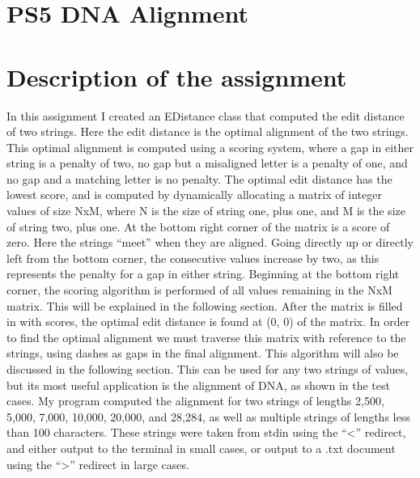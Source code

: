 \documentclass[12pt]{article}
\begin{document}
\section*{PS5 DNA Alignment}
\section[1]{Description of the assignment}
\hfill\begin{minipage}{\dimexpr\textwidth-1cm}
In this assignment I created an EDistance class that computed the edit distance of two strings. Here the edit distance is the optimal alignment of the two strings. This optimal alignment is computed using a scoring system, where a gap in either string is a penalty of two, no gap but a misaligned letter is a penalty of one, and no gap and a matching letter is no penalty. The optimal edit distance has the lowest score, and is computed by dynamically allocating a matrix of integer values of size NxM, where N is the size of string one, plus one, and M is the size of string two, plus one. At the bottom right corner of the matrix is a score of zero. Here the strings “meet” when they are aligned. Going directly up or directly left from the bottom corner, the consecutive values increase by two, as this represents the penalty for a gap in either string. Beginning at the bottom right corner, the scoring algorithm is performed of all values remaining in the NxM matrix. This will be explained in the following section. After the matrix is filled in with scores, the optimal edit distance is found at (0, 0) of the matrix. \newline
\newline
In order to find the optimal alignment we must traverse this matrix with reference to the strings, using dashes as gaps in the final alignment. This algorithm will also be discussed in the following section. This can be used for any two strings of values, but its most useful application is the alignment of DNA, as shown in the test cases. My program computed the alignment for two strings of lengths 2,500, 5,000, 7,000, 10,000, 20,000, and 28,284, as well as multiple strings of lengths less than 100 characters. These strings were taken from stdin using the “<” redirect, and either output to the terminal in small cases, or output to a .txt document using the “>” redirect in large cases. 
\end{minipage}
\end{document}
